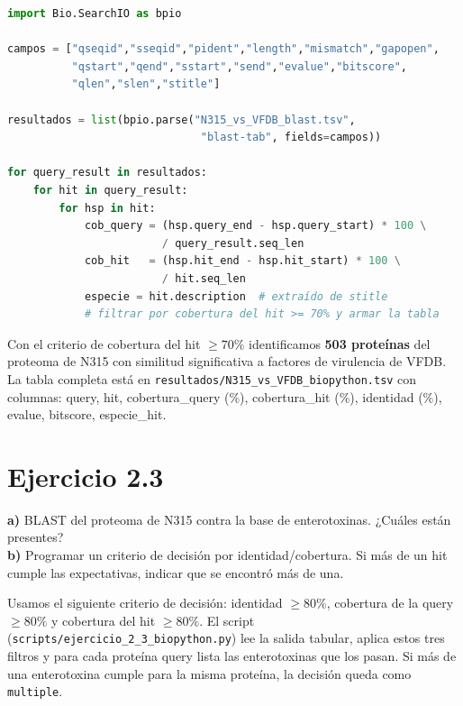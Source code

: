 \begin{lstlisting}[language=Python]
import Bio.SearchIO as bpio

campos = ["qseqid","sseqid","pident","length","mismatch","gapopen",
          "qstart","qend","sstart","send","evalue","bitscore",
          "qlen","slen","stitle"]

resultados = list(bpio.parse("N315_vs_VFDB_blast.tsv",
                              "blast-tab", fields=campos))

for query_result in resultados:
    for hit in query_result:
        for hsp in hit:
            cob_query = (hsp.query_end - hsp.query_start) * 100 \
                        / query_result.seq_len
            cob_hit   = (hsp.hit_end - hsp.hit_start) * 100 \
                        / hit.seq_len
            especie = hit.description  # extraído de stitle
            # filtrar por cobertura del hit >= 70% y armar la tabla
\end{lstlisting}

Con el criterio de cobertura del hit $\geq 70\%$ identificamos \textbf{503 proteínas} del proteoma de N315
con similitud significativa a factores de virulencia de VFDB. La tabla completa está en
\texttt{resultados/N315\_vs\_VFDB\_biopython.tsv} con columnas: query, hit, cobertura\_query (\%),
cobertura\_hit (\%), identidad (\%), evalue, bitscore, especie\_hit.

\section{Ejercicio 2.3}

\begin{consigna}
\textbf{a)} BLAST del proteoma de N315 contra la base de enterotoxinas. ¿Cuáles están presentes? \\
\textbf{b)} Programar un criterio de decisión por identidad/cobertura. Si más de un hit cumple las
expectativas, indicar que se encontró más de una.
\end{consigna}

Usamos el siguiente criterio de decisión: identidad $\geq 80\%$, cobertura de la query $\geq 80\%$ y
cobertura del hit $\geq 80\%$. El script (\texttt{scripts/ejercicio\_2\_3\_biopython.py}) lee la salida
tabular, aplica estos tres filtros y para cada proteína query lista las enterotoxinas que los pasan. Si
más de una enterotoxina cumple para la misma proteína, la decisión queda como \texttt{multiple}.

